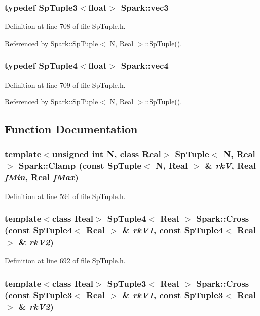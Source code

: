 \subsubsection{\setlength{\rightskip}{0pt plus 5cm}typedef Sp\-Tuple3$<$float$>$ {\bf Spark::vec3}}\label{namespaceSpark_a8}


Definition at line 708 of file Sp\-Tuple.h.

Referenced by Spark::Sp\-Tuple$<$ N, Real $>$::Sp\-Tuple().
\subsubsection{\setlength{\rightskip}{0pt plus 5cm}typedef Sp\-Tuple4$<$float$>$ {\bf Spark::vec4}}\label{namespaceSpark_a9}


Definition at line 709 of file Sp\-Tuple.h.

Referenced by Spark::Sp\-Tuple$<$ N, Real $>$::Sp\-Tuple().

\subsection{Function Documentation}
\subsubsection{\setlength{\rightskip}{0pt plus 5cm}template$<$unsigned int N, class Real$>$ Sp\-Tuple$<$ N, Real $>$ Spark::Clamp (const Sp\-Tuple$<$ N, Real $>$ \& {\em rk\-V}, Real {\em f\-Min}, Real {\em f\-Max})}\label{namespaceSpark_a123}


Definition at line 594 of file Sp\-Tuple.h.
\subsubsection{\setlength{\rightskip}{0pt plus 5cm}template$<$class Real$>$ Sp\-Tuple4$<$ Real $>$ Spark::Cross (const Sp\-Tuple4$<$ Real $>$ \& {\em rk\-V1}, const Sp\-Tuple4$<$ Real $>$ \& {\em rk\-V2})}\label{namespaceSpark_a130}


Definition at line 692 of file Sp\-Tuple.h.
\subsubsection{\setlength{\rightskip}{0pt plus 5cm}template$<$class Real$>$ Sp\-Tuple3$<$ Real $>$ Spark::Cross (const Sp\-Tuple3$<$ Real $>$ \& {\em rk\-V1}, const Sp\-Tuple3$<$ Real $>$ \& {\em rk\-V2})}\label{namespaceSpark_a127}


